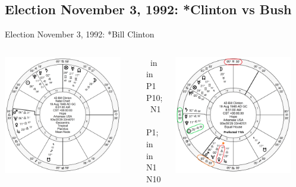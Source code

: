 \subsection{Election November 3, 1992: *Clinton vs Bush}
\begin{frame}[t]{Election November 3, 1992: *Bill Clinton}
\small

\begin{columns}[T, onlytextwidth]
\vspace{-1em}
{\includegraphics[width=0.9\textwidth]{charts/Clinton.png}}
\fontsize{8pt}{9pt}\selectfont

\Sun\, in \Leo\, in P1 \Square\, P10; \Sextile\, N1 \\
\Venus\, \Sextile\, P1; in \Libra\, in N1 \Square\, N10

\vspace{-1em}
{\includegraphics[width=0.9\textwidth]{charts/Clinton-Prof-11th.png}}
\fontsize{8pt}{9pt}\selectfont


\end{columns}
\end{frame}
